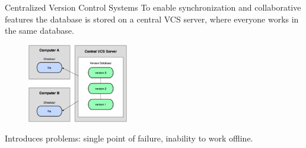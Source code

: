 \documentclass{beamer}
\def \figureHeight {130px}
\begin{document}
\begin{frame}{Centralized Version Control Systems}
	To enable synchronization and collaborative features the database is stored on a central VCS server, where everyone works in the same database.
	\begin{figure}
		\includegraphics[height=\figureHeight]{images/central-version-control.png}
	\end{figure}
	Introduces problems: single point of failure, inability to work offline.
\end{frame}
\end{document}
